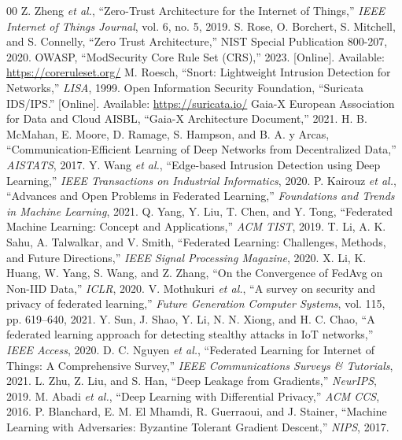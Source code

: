\documentclass[conference]{IEEEtran}
\begin{document}
\begin{thebibliography}{00}
 Z. Zheng \textit{et al.}, ``Zero-Trust Architecture for the Internet of Things,'' \textit{IEEE Internet of Things Journal}, vol. 6, no. 5, 2019.
 S. Rose, O. Borchert, S. Mitchell, and S. Connelly, ``Zero Trust Architecture,'' NIST Special Publication 800-207, 2020.
 OWASP, ``ModSecurity Core Rule Set (CRS),'' 2023. [Online]. Available: \url{https://coreruleset.org/}
 M. Roesch, ``Snort: Lightweight Intrusion Detection for Networks,'' \textit{LISA}, 1999.
 Open Information Security Foundation, ``Suricata IDS/IPS.'' [Online]. Available: \url{https://suricata.io/}
 Gaia-X European Association for Data and Cloud AISBL, ``Gaia-X Architecture Document,'' 2021.
 H. B. McMahan, E. Moore, D. Ramage, S. Hampson, and B. A. y Arcas, ``Communication-Efficient Learning of Deep Networks from Decentralized Data,'' \textit{AISTATS}, 2017.
 Y. Wang \textit{et al.}, ``Edge-based Intrusion Detection using Deep Learning,'' \textit{IEEE Transactions on Industrial Informatics}, 2020.
 P. Kairouz \textit{et al.}, ``Advances and Open Problems in Federated Learning,'' \textit{Foundations and Trends in Machine Learning}, 2021.
 Q. Yang, Y. Liu, T. Chen, and Y. Tong, ``Federated Machine Learning: Concept and Applications,'' \textit{ACM TIST}, 2019.
 T. Li, A. K. Sahu, A. Talwalkar, and V. Smith, ``Federated Learning: Challenges, Methods, and Future Directions,'' \textit{IEEE Signal Processing Magazine}, 2020.
 X. Li, K. Huang, W. Yang, S. Wang, and Z. Zhang, ``On the Convergence of FedAvg on Non-IID Data,'' \textit{ICLR}, 2020.
 V. Mothukuri \textit{et al.}, ``A survey on security and privacy of federated learning,'' \textit{Future Generation Computer Systems}, vol. 115, pp. 619--640, 2021.
 Y. Sun, J. Shao, Y. Li, N. N. Xiong, and H. C. Chao, ``A federated learning approach for detecting stealthy attacks in IoT networks,'' \textit{IEEE Access}, 2020.
 D. C. Nguyen \textit{et al.}, ``Federated Learning for Internet of Things: A Comprehensive Survey,'' \textit{IEEE Communications Surveys \& Tutorials}, 2021.
 L. Zhu, Z. Liu, and S. Han, ``Deep Leakage from Gradients,'' \textit{NeurIPS}, 2019.
 M. Abadi \textit{et al.}, ``Deep Learning with Differential Privacy,'' \textit{ACM CCS}, 2016.
 P. Blanchard, E. M. El Mhamdi, R. Guerraoui, and J. Stainer, ``Machine Learning with Adversaries: Byzantine Tolerant Gradient Descent,'' \textit{NIPS}, 2017.

\end{thebibliography}
\end{document}
